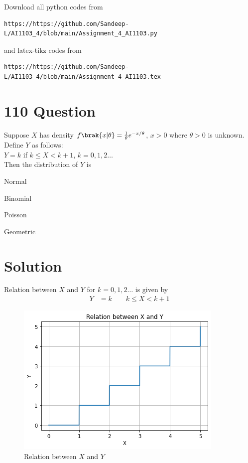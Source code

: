\documentclass[journal,12pt,twocolumn]{IEEEtran}
\begin{document}
Download all python codes from 
\begin{lstlisting}
https://https://github.com/Sandeep-L/AI1103_4/blob/main/Assignment_4_AI1103.py
\end{lstlisting}
%
and latex-tikz codes from 
%
\begin{lstlisting}
https://https://github.com/Sandeep-L/AI1103_4/blob/main/Assignment_4_AI1103.tex
\end{lstlisting}

\section*{110 Question}

Suppose $X$ has density $f\brak{x|\theta} = \frac{1}{\theta}e^{-x/\theta}$, $x>0$ where $\theta>0$ is unknown. Define $Y$ as follows:\\
$Y=k$ \hfill if \hfill $k\leq X<k+1$, \hfill $k=0,1,2\ldots$\\
Then the distribution of $Y$ is
\begin{enumerate}
\begin{multicols}{2}
\setlength\itemsep{0.5em}
    \item Normal
    \item Binomial
    \item Poisson
    \item Geometric
\end{multicols}
\end{enumerate}

\section*{Solution}

Relation between $X$ and $Y$ for $k=0,1,2\ldots$ is given by
\begin{align}
    Y &= k \qquad  k\leq X < k+1
\end{align}

\begin{figure}[h]
    \centering
    \includegraphics[width=\columnwidth]{Assignment_4_AI1103.png}
    \caption{Relation between $X$ and $Y$}
    \label{fig:1}
\end{figure}
\end{document}
